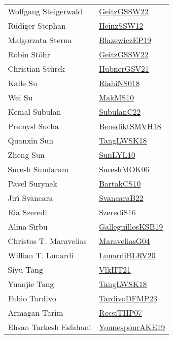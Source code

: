 {\begin{longtable}{p{4cm}p{20cm}}
Wolfgang Steigerwald & \href{papers/GeitzGSSW22.pdf}{GeitzGSSW22}\cite{GeitzGSSW22} \\
R{\"{u}}diger Stephan & \href{articles/HeinzSSW12.pdf}{HeinzSSW12}\cite{HeinzSSW12} \\
Malgorzata Sterna & \href{}{BlazewiczEP19}\cite{BlazewiczEP19} \\
Robin St{\"{o}}hr & \href{papers/GeitzGSSW22.pdf}{GeitzGSSW22}\cite{GeitzGSSW22} \\
Christian St{\"{u}}rck & \href{articles/HubnerGSV21.pdf}{HubnerGSV21}\cite{HubnerGSV21} \\
Kaile Su & \href{papers/RiahiNS018.pdf}{RiahiNS018}\cite{RiahiNS018} \\
Wei Su & \href{papers/MakMS10.pdf}{MakMS10}\cite{MakMS10} \\
Kemal Subulan & \href{articles/SubulanC22.pdf}{SubulanC22}\cite{SubulanC22} \\
Premysl Sucha & \href{papers/BenediktSMVH18.pdf}{BenediktSMVH18}\cite{BenediktSMVH18} \\
Quanxin Sun & \href{}{TangLWSK18}\cite{TangLWSK18} \\
Zheng Sun & \href{papers/SunLYL10.pdf}{SunLYL10}\cite{SunLYL10} \\
Suresh Sundaram & \href{}{SureshMOK06}\cite{SureshMOK06} \\
Pavel Surynek & \href{articles/BartakCS10.pdf}{BartakCS10}\cite{BartakCS10} \\
Jir{\'{\i}} Svancara & \href{}{SvancaraB22}\cite{SvancaraB22} \\
Ria Szeredi & \href{papers/SzerediS16.pdf}{SzerediS16}\cite{SzerediS16} \\
Alina S{\^{\i}}rbu & \href{papers/GalleguillosKSB19.pdf}{GalleguillosKSB19}\cite{GalleguillosKSB19} \\
Christos T. Maravelias & \href{papers/MaraveliasG04.pdf}{MaraveliasG04}\cite{MaraveliasG04} \\
Willian T. Lunardi & \href{articles/LunardiBLRV20.pdf}{LunardiBLRV20}\cite{LunardiBLRV20} \\
Siyu Tang & \href{articles/VlkHT21.pdf}{VlkHT21}\cite{VlkHT21} \\
Yuanjie Tang & \href{}{TangLWSK18}\cite{TangLWSK18} \\
Fabio Tardivo & \href{papers/TardivoDFMP23.pdf}{TardivoDFMP23}\cite{TardivoDFMP23} \\
Armagan Tarim & \href{papers/RossiTHP07.pdf}{RossiTHP07}\cite{RossiTHP07} \\
Ehsan Tarkesh Esfahani & \href{}{YounespourAKE19}\cite{YounespourAKE19} \\

\end{longtable}}
